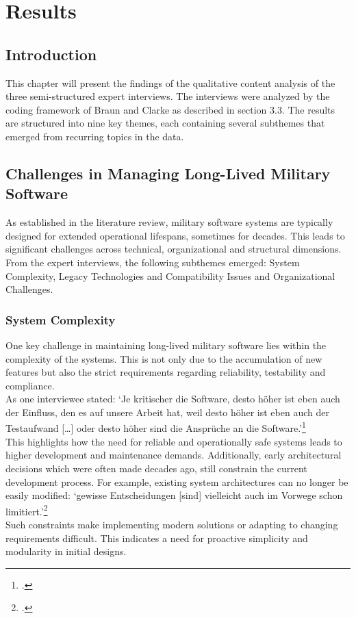 \section{Results}
\subsection{Introduction}
This chapter will present the findings of the qualitative content analysis of the three semi-structured expert interviews. The interviews were analyzed by the coding framework of Braun and Clarke as described in section 3.3.
The results are structured into nine key themes, each containing several subthemes that emerged from recurring topics in the data.
\subsection{Challenges in Managing Long-Lived Military Software}
As established in the literature review, military software systems are typically designed for extended operational lifespans, sometimes for decades. This leads to significant challenges across technical, organizational and structural dimensions.
From the expert interviews, the following subthemes emerged: System Complexity, Legacy Technologies and Compatibility Issues and Organizational Challenges.

\subsubsection{System Complexity}
One key challenge in maintaining long-lived military software lies within the complexity of the systems. This is not only due to the accumulation of new features but also the strict requirements regarding reliability, testability and compliance.\\

As one interviewee stated: `Je kritischer die Software, desto höher ist eben auch der Einfluss, den es auf unsere Arbeit hat, weil desto höher ist eben auch der Testaufwand [\ldots] oder desto höher sind die Ansprüche an die Software.'\footcite{Interview22025}\\

This highlights how the need for reliable and operationally safe systems leads to higher development and maintenance demands. Additionally, early architectural decisions which were often made decades ago, 
still constrain the current development process. For example, existing system architectures can no longer be easily modified: `gewisse Entscheidungen [sind] vielleicht auch im Vorwege schon limitiert.'\footcite{Interview12025}\\
Such constraints make implementing modern solutions or adapting to changing requirements difficult. This indicates a need for proactive simplicity and modularity in initial designs.

